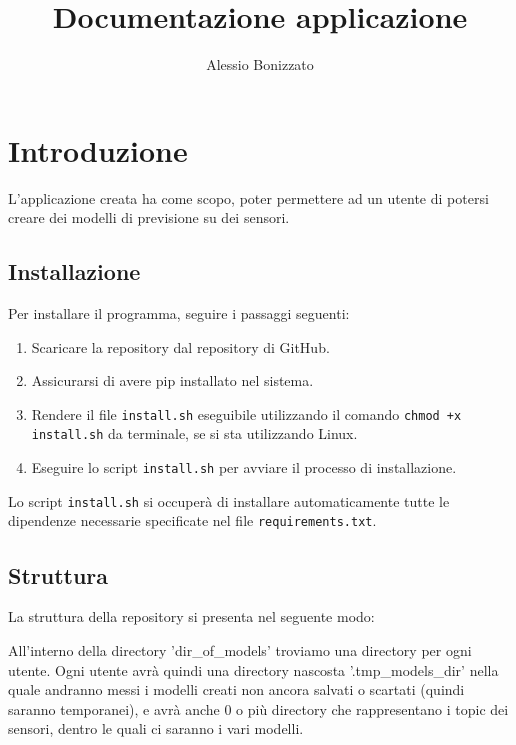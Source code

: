 \documentclass[a4paper,10pt]{article}
\begin{document}
\title{Documentazione applicazione}
\author{Alessio Bonizzato}
\date{}
\maketitle %

\section{Introduzione}
L'applicazione creata ha come scopo, poter permettere ad un utente di potersi creare dei modelli di previsione su dei sensori. 

\subsection{Installazione}
Per installare il programma, seguire i passaggi seguenti:

\begin{enumerate}
  \item Scaricare la repository dal repository di GitHub.
  \item Assicurarsi di avere pip installato nel sistema.
  \item Rendere il file \texttt{install.sh} eseguibile utilizzando il comando \texttt{chmod +x install.sh} da terminale, se si sta utilizzando Linux.
  \item Eseguire lo script \texttt{install.sh} per avviare il processo di installazione.
\end{enumerate}

Lo script \texttt{install.sh} si occuperà di installare automaticamente tutte le dipendenze necessarie specificate nel file \texttt{requirements.txt}.

\subsection{Struttura}
La struttura della repository si presenta nel seguente modo:



All'interno della directory 'dir\_of\_models' troviamo una directory per ogni utente. Ogni utente avrà quindi una directory nascosta '.tmp\_models\_dir' nella quale andranno messi i modelli creati non ancora salvati o scartati (quindi saranno temporanei), e avrà anche 0 o più directory che rappresentano i topic dei sensori, dentro le quali ci saranno i vari modelli.
\end{document}
